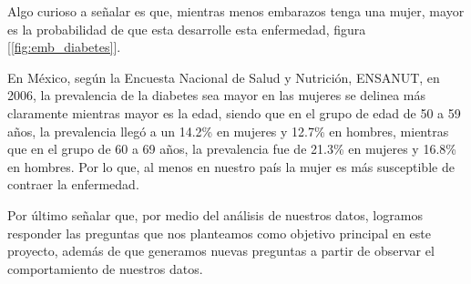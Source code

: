 \documentclass{article}
\begin{document}
Algo curioso a señalar es que, mientras menos embarazos tenga una mujer, mayor es la probabilidad de que esta desarrolle esta enfermedad, figura [\ref{fig:emb_diabetes}].

En México, según la Encuesta Nacional de Salud y Nutrición, ENSANUT, en 2006, la prevalencia de la diabetes sea mayor en las mujeres se delinea más claramente mientras mayor es la edad, siendo que en el grupo de edad de 50 a 59 años, la prevalencia llegó a un 14.2\% en mujeres y 12.7\% en hombres, mientras que en el grupo de 60 a 69 años, la prevalencia fue de 21.3\% en mujeres y 16.8\% en hombres\cite{diabmx}. Por lo que, al menos en nuestro país la mujer es más susceptible de contraer la enfermedad.

Por último señalar que, por medio del análisis de nuestros datos, logramos responder las preguntas que nos planteamos como objetivo principal en este proyecto, además de que generamos nuevas preguntas a partir de observar el comportamiento de nuestros datos.



\onecolumn{
  
  
}
\end{document}
